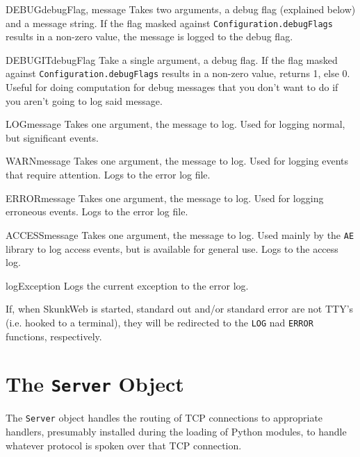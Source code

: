 \documentclass{manual}
\begin{document}
\begin{funcdesc}{DEBUG}{debugFlag, message} Takes two arguments, a debug flag (explained below) and a
message string.  If the flag masked against \verb!Configuration.debugFlags!
results in a non-zero value, the message is logged to the debug flag.
\end{funcdesc}
\begin{funcdesc}{DEBUGIT}{debugFlag} Take a single argument, a debug flag.  If the flag
masked against \verb!Configuration.debugFlags! 
results in a non-zero value, returns 1, else 0.  Useful for doing
computation for debug messages that you don't want to do if you aren't
going to log said message.
\end{funcdesc}
\begin{funcdesc}{LOG}{message} Takes one argument, the message to log.  Used for logging
normal, but significant events.
\end{funcdesc}
\begin{funcdesc}{WARN}{message} Takes one argument, the message to log.  Used for logging
events that require attention.  Logs to the error log file. 
\end{funcdesc}
\begin{funcdesc}{ERROR}{message} Takes one argument, the message to log.  Used for logging
erroneous events.  Logs to the error log file.
\end{funcdesc}
\begin{funcdesc}{ACCESS}{message} Takes one argument, the message to log.  Used mainly by
the \texttt{AE} library to log access events, but is available for
general use.  Logs to the access log.
\end{funcdesc}
\begin{funcdesc}{logException}{} Logs the current exception to the error log.
\end{funcdesc}


If, when SkunkWeb is started, standard out and/or standard error are
not TTY's (i.e. hooked to a terminal), they will be redirected to the
\texttt{LOG} nad \texttt{ERROR} functions, respectively.

\section{The \texttt{Server} Object}
The \texttt{Server} object handles the routing of TCP connections to
appropriate handlers, presumably installed during the loading of
Python modules, to handle whatever protocol is spoken over that TCP
connection. 
\end{document}
